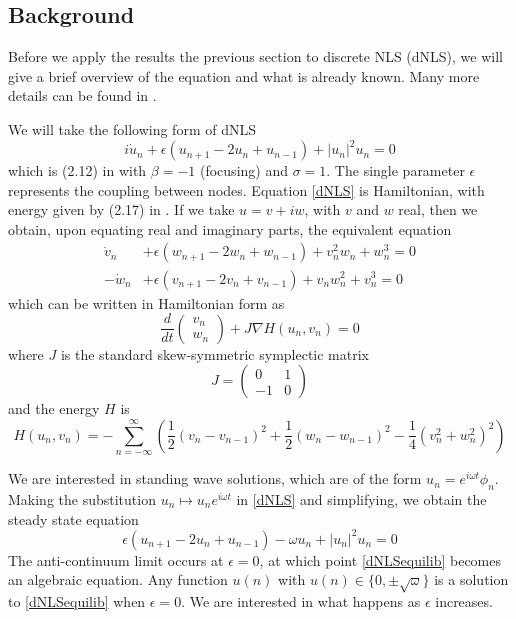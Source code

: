 \documentclass[12pt]{article}
\begin{document}
\subsection{Background}

Before we apply the results the previous section to discrete NLS (dNLS), we will give a brief overview of the equation and what is already known. Many more details can be found in \cite{Kevrekidis2009}. 

We will take the following form of dNLS
\begin{equation}\label{dNLS}
i\dot{u}_n + \epsilon(u_{n+1} - 2 u_n + u_{n-1}) + |u_n|^2 u_n = 0
\end{equation}
which is (2.12) in \cite{Kevrekidis2009} with $\beta = -1$ (focusing) and $\sigma = 1$. The single parameter $\epsilon$ represents the coupling between nodes. Equation \eqref{dNLS} is Hamiltonian, with energy given by (2.17) in \cite{Kevrekidis2009}. If we take $u = v + i w$, with $v$ and $w$ real, then we obtain, upon equating real and imaginary parts,  the equivalent equation
\begin{equation}\label{dNLSreal}
\begin{aligned}
\dot{v}_n  &+ \epsilon (w_{n+1} - 2 w_n + w_{n-1}) + v_n^2 w_n + w_n^3 = 0 \\
-\dot{w}_n &+ \epsilon (v_{n+1} - 2 v_n + v_{n-1}) + v_n w_n^2 + v_n^3 = 0
\end{aligned}
\end{equation}
which can be written in Hamiltonian form as
\begin{equation}\label{dNLSrealHam}
\frac{d}{dt}\begin{pmatrix}v_n \\ w_n\end{pmatrix}
+ J \nabla H(u_n, v_n) = 0
\end{equation}
where $J$ is the standard skew-symmetric symplectic matrix
\[
J = \begin{pmatrix}0 & 1 \\ -1 & 0\end{pmatrix}
\]
and the energy $H$ is
\begin{equation}\label{dNLSrealH}
H(u_n, v_n) = -\sum_{n = -\infty}^\infty 
\left( \frac{1}{2}\left(v_n - v_{n-1}\right)^2 + \frac{1}{2}\left(w_n - w_{n-1}\right)^2 - \frac{1}{4}\left( v_n^2 + w_n^2 \right)^2 \right)
\end{equation}

We are interested in standing wave solutions, which are of the form $u_n = e^{i \omega t}\phi_n $. Making the substitution $u_n \mapsto u_n e^{i \omega t}$ in \eqref{dNLS} and simplifying, we obtain the steady state equation
\begin{equation}\label{dNLSequilib}
\epsilon(u_{n+1} - 2 u_n + u_{n-1}) - \omega u_n + |u_n|^2 u_n = 0
\end{equation}
The anti-continuum limit occurs at $\epsilon = 0$, at which point \eqref{dNLSequilib} becomes an algebraic equation. Any function $u(n)$ with $u(n) \in \{ 0, \pm \sqrt{\omega}\}$ is a solution to \eqref{dNLSequilib} when $\epsilon = 0$. We are interested in what happens as $\epsilon$ increases.
\end{document}
